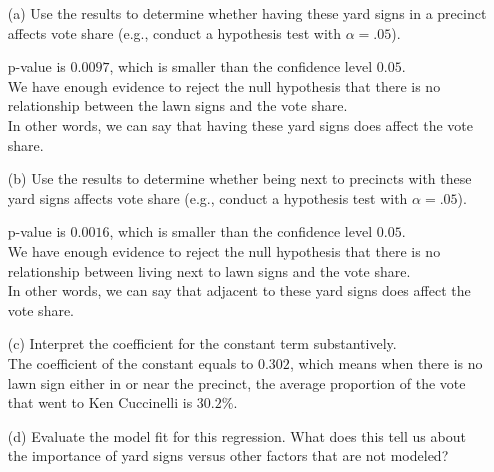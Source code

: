 \documentclass[12pt,letterpaper]{article}
\begin{document}
\vspace{.5cm}
\begin{enumerate}
	\item [(a)] Use the results to determine whether having these yard signs in a precinct affects vote share (e.g., conduct a hypothesis test with $\alpha = .05$).
	\vspace{.5cm}
	 
	p-value is $0.0097$, which is smaller than the confidence level $0.05$.\\
	We have enough evidence to reject the null hypothesis that there is no relationship between the lawn signs and the vote share.\\
	\newpage
	In other words, we can say that having these yard signs does affect the vote share.\\
	\vspace{.5cm}
	
			
	\item [(b)]  Use the results to determine whether being
	next to precincts with these yard signs affects vote
	share (e.g., conduct a hypothesis test with $\alpha = .05$).
	
	\vspace{.5cm}
	 
	p-value is $0.0016$, which is smaller than the confidence level $0.05$.\\
	We have enough evidence to reject the null hypothesis that there is no relationship between living next to lawn signs and the vote share.\\
	In other words, we can say that adjacent to these yard signs does affect the vote share.\\
	
	
	\item [(c)] Interpret the coefficient for the constant term substantively.\\
	
	\vspace{.5cm}
	The coefficient of the constant equals to $0.302$, which means when there is no lawn sign either in or near the precinct,
	the average proportion of the vote that went to Ken Cuccinelli is $30.2\%$.\\
	\vspace{.5cm}
	
	\item [(d)] Evaluate the model fit for this regression.  What does this	tell us about the importance of yard signs versus other factors that are not modeled?\\
	\vspace{.5cm}
	

\end{enumerate}
\end{document}
